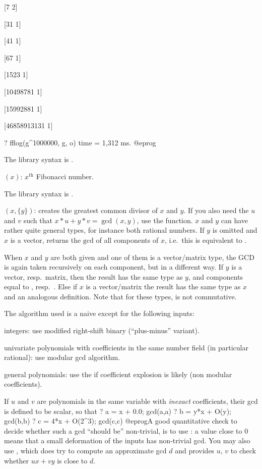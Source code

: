 [7 2]

[31 1]

[41 1]

[67 1]

[1523 1]

[10498781 1]

[15992881 1]

[46858913131 1]

? fflog(g^1000000, g, o)
time = 1,312 ms.
@eprog

The library syntax is .

$(x)$: \label{se:fibonacci}$x^{\text{th}}$ Fibonacci number.

The library syntax is .

$(x,\{y\})$: \label{se:gcd}creates the greatest common divisor of $x$ and $y$.
If you also need the $u$ and $v$ such that $x*u + y*v = \gcd(x,y)$,
use the  function. $x$ and $y$ can have rather quite general
types, for instance both rational numbers. If $y$ is omitted and $x$ is a
vector, returns the $\text{gcd}$ of all components of $x$, i.e.~this is
equivalent to .

When $x$ and $y$ are both given and one of them is a vector/matrix type,
the GCD is again taken recursively on each component, but in a different way.
If $y$ is a vector, resp.~matrix, then the result has the same type as $y$,
and components equal to , resp.~. Else
if $x$ is a vector/matrix the result has the same type as $x$ and an
analogous definition. Note that for these types,  is not
commutative.

The algorithm used is a naive  except for the following inputs:

\item integers: use modified right-shift binary (``plus-minus''
variant).

\item univariate polynomials with coefficients in the same number
field (in particular rational): use modular gcd algorithm.

\item general polynomials: use the  if
coefficient explosion is likely (non modular coefficients).

If $u$ and $v$ are polynomials in the same variable with \emph{inexact}
coefficients, their gcd is defined to be scalar, so that
\bprog
? a = x + 0.0; gcd(a,a)
? b = y*x + O(y); gcd(b,b)
? c = 4*x + O(2^3); gcd(c,c)
@eprog\noindent A good quantitative check to decide whether such a
gcd ``should be'' non-trivial, is to use : a value
close to $0$ means that a small deformation of the inputs has non-trivial gcd.
You may also use , which does try to compute an approximate gcd
$d$ and provides $u$, $v$ to check whether $u x + v y$ is close to $d$.

